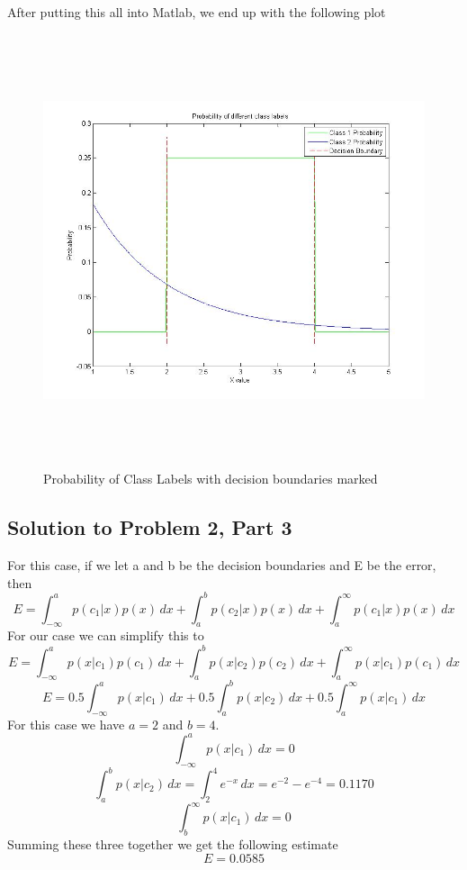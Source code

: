 \documentclass[11pt,psfig]{article}
\begin{document}
After putting this all into Matlab, we end up with the following plot
\begin{figure}[H]
\centering
\includegraphics[height=5in]{prob2plot.jpg}
\caption{Probability of Class Labels with decision boundaries marked}
\end{figure}

\subsection*{Solution to Problem 2, Part 3}

For this case, if we let a and b be the decision boundaries and E be the error, then
\[
E = \int_{-\infty}^{a}{p(c_1|x)p(x) \, dx} + \int_{a}^{b}{p(c_2|x)p(x) \, dx} + \int_{a}^{\infty}{p(c_1|x)p(x) \, dx}
\]
For our case we can simplify this to
\[
E = \int_{-\infty}^{a}{p(x|c_1)p(c_1) \, dx} + \int_{a}^{b}{p(x|c_2)p(c_2) \, dx} + \int_{a}^{\infty}{p(x|c_1)p(c_1) \, dx}
\]
\[
E = 0.5\int_{-\infty}^{a}{p(x|c_1) \, dx} + 0.5\int_{a}^{b}{p(x|c_2) \, dx} + 0.5\int_{a}^{\infty}{p(x|c_1) \, dx}
\]
For this case we have $a=2$ and $b=4$. \\
\[
\int_{-\infty}^{a}{p(x|c_1) \, dx} = 0
\]
\[
\int_{a}^{b}{p(x|c_2) \, dx} = \int_{2}^{4}{e^{-x} \, dx} = e^{-2} - e^{-4} = 0.1170
\]
\[
\int_{b}^{\infty}{p(x|c_1) \, dx} = 0
\]
Summing these three together we get the following estimate
\[
E = 0.0585
\]
\end{document}
